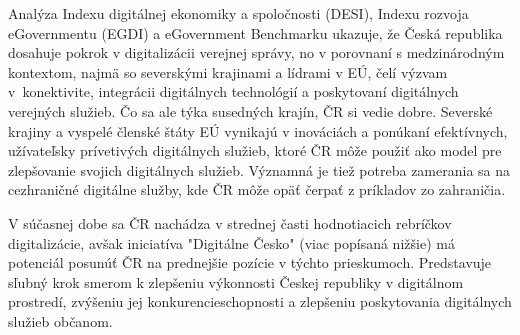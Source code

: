 
Analýza Indexu digitálnej ekonomiky a spoločnosti (DESI), Indexu rozvoja eGovernmentu (EGDI) a eGovernment Benchmarku ukazuje, že Česká republika dosahuje pokrok v digitalizácii verejnej správy, no v porovnaní s medzinárodným kontextom, najmä so severskými krajinami a lídrami v EÚ, čelí výzvam v~konektivite, integrácii digitálnych technológií a poskytovaní digitálnych verejných služieb. Čo sa ale týka susedných krajín, ČR si vedie dobre. Severské krajiny a vyspelé členské štáty EÚ vynikajú v inováciách a ponúkaní efektívnych, užívateľsky prívetivých digitálnych služieb, ktoré ČR môže použiť ako model pre zlepšovanie svojich digitálnych služieb. Významná je tiež potreba zamerania sa na cezhraničné digitálne služby, kde ČR môže opäť čerpať z príkladov zo zahraničia.

V súčasnej dobe sa ČR nachádza v strednej časti hodnotiacich rebríčkov digitalizácie, avšak iniciatíva "Digitálne Česko" (viac popísaná nižšie) má potenciál posunúť ČR na prednejšie pozície v týchto prieskumoch. Predstavuje sľubný krok smerom k zlepšeniu výkonnosti Českej republiky v digitálnom prostredí, zvýšeniu jej konkurencieschopnosti a zlepšeniu poskytovania digitálnych služieb občanom.


%
%
%

